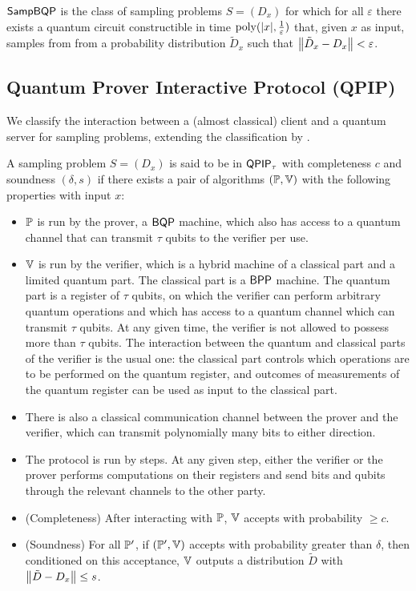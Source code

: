  

\begin{definition} [$\SampBQP$]
	$\SampBQP$ is the class of sampling problems $S=(D_x)$ for which for all $\varepsilon$ there exists a quantum circuit constructible in time $\operatorname*{\operatorname{poly}}(|x|, \frac{1}{\varepsilon})$ that, given $x$ as input, samples from from a probability distribution $\tilde{D}_x$ such that $\left\lVert\tilde{D}_x-D_x\right\rVert<\varepsilon$.
\end{definition}

\subsection{Quantum Prover Interactive Protocol (QPIP)}
We classify the interaction between a (almost classical) client and a quantum server for sampling problems, extending the classification by \cite{mahadev_delegation}.

\begin{definition}
	A sampling problem $S=(D_x)$ is said to be in $\operatorname{\mathsf{QPIP}}_\tau$ with completeness $c$ and soundness $(\delta, s)$ if there exists a pair of algorithms  $(\mathbb{P}, \mathbb{V})$ with the following properties with input $x$:
	\begin{itemize}
		\item $\mathbb{P}$ is run by the prover, a $\operatorname{\mathsf{BQP}}$ machine, which also has access to a quantum channel that can transmit $\tau$ qubits to the verifier per use.
		\item $\mathbb{V}$ is run by the verifier, which is a hybrid machine of a classical part and a limited quantum part. The classical part is a $\operatorname{\mathsf{BPP}}$ machine. The quantum part is a register of $\tau$ qubits, on which the verifier can perform arbitrary quantum operations and which has access to a quantum channel which can transmit $\tau$ qubits. At any given time, the verifier is not allowed to possess more than $\tau$ qubits. The interaction between the quantum and classical parts of the verifier is the usual one: the classical part controls which operations are to be performed on the quantum register, and outcomes of measurements of the quantum register can be used as input to the classical part.
		 \item There is also a classical communication channel between the prover and the verifier, which can transmit polynomially many bits to either direction. 
		 \item The protocol is run by steps. At any given step, either the verifier or the prover performs computations on their registers and send bits and qubits through the relevant channels to the other party.	 
		\item (Completeness) After interacting with $\mathbb{P}$, $\mathbb{V}$ accepts with probability $\geq c$.
		\item (Soundness) For all $\mathbb{P}'$, if $(\mathbb{P}', \mathbb{V})$ accepts with probability greater than $\delta$, then conditioned on this acceptance, $\mathbb{V}$ outputs a distribution $\tilde{D}$ with $\left\lVert\tilde{D}-D_x\right\rVert\leq s$.
	\end{itemize}
\end{definition}

